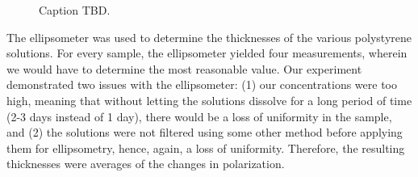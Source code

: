 \documentclass[twocolumn]{article}
\begin{document}
                \begin{figure}
                    \centering
                    \caption{Caption TBD.}\label{fig:ellips}
                \end{figure}

                The ellipsometer was used to determine the thicknesses of the various polystyrene solutions. For every sample, the ellipsometer yielded four measurements, wherein we would have to determine the most reasonable value. Our experiment demonstrated two issues with the ellipsometer: (1) our concentrations were too high, meaning that without letting the solutions dissolve for a long period of time (2-3 days instead of 1 day), there would be a loss of uniformity in the sample, and (2) the solutions were not filtered using some other method before applying them for ellipsometry, hence, again, a loss of uniformity. Therefore, the resulting thicknesses were averages of the changes in polarization.
\end{document}
